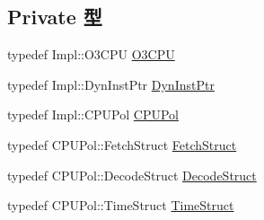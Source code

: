 \subsection*{Private 型}
\begin{DoxyCompactItemize}
\item 
typedef Impl::O3CPU \hyperlink{classDefaultDecode_a44622cf06940413482836cb62931ac3f}{O3CPU}
\item 
typedef Impl::DynInstPtr \hyperlink{classDefaultDecode_a028ce10889c5f6450239d9e9a7347976}{DynInstPtr}
\item 
typedef Impl::CPUPol \hyperlink{classDefaultDecode_a87d662eaeb9eab249d671b63cb4ba11a}{CPUPol}
\item 
typedef CPUPol::FetchStruct \hyperlink{classDefaultDecode_a3aac8607069f16898ef53cfaa2d97aeb}{FetchStruct}
\item 
typedef CPUPol::DecodeStruct \hyperlink{classDefaultDecode_a38077cd156cf219016abf92d8c5b523b}{DecodeStruct}
\item 
typedef CPUPol::TimeStruct \hyperlink{classDefaultDecode_ab7dd3632ef639702a5c6e7c2c3a2f82a}{TimeStruct}
\end{DoxyCompactItemize}
